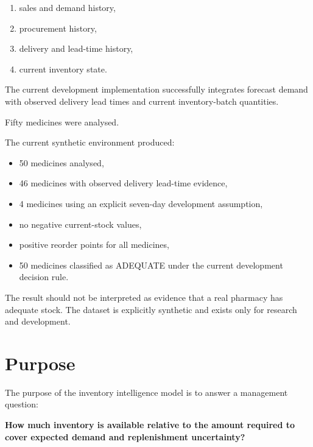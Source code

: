 \documentclass[11pt,a4paper]{article}
\begin{document}
\begin{enumerate}[leftmargin=*]
    \item sales and demand history,
    \item procurement history,
    \item delivery and lead-time history,
    \item current inventory state.
\end{enumerate}

The current development implementation successfully integrates
forecast demand with observed delivery lead times and current
inventory-batch quantities.

Fifty medicines were analysed.

The current synthetic environment produced:

\begin{itemize}
    \item 50 medicines analysed,
    \item 46 medicines with observed delivery lead-time evidence,
    \item 4 medicines using an explicit seven-day development assumption,
    \item no negative current-stock values,
    \item positive reorder points for all medicines,
    \item 50 medicines classified as ADEQUATE under the current
          development decision rule.
\end{itemize}

The result should not be interpreted as evidence that a real pharmacy
has adequate stock. The dataset is explicitly synthetic and exists
only for research and development.

\section{Purpose}

The purpose of the inventory intelligence model is to answer a
management question:

\begin{tcolorbox}[
    colframe=blueColor,
    colback=white,
    arc=2mm
]
\centering
\textbf{How much inventory is available relative to the amount
required to cover expected demand and replenishment uncertainty?}
\end{tcolorbox}
\end{document}
